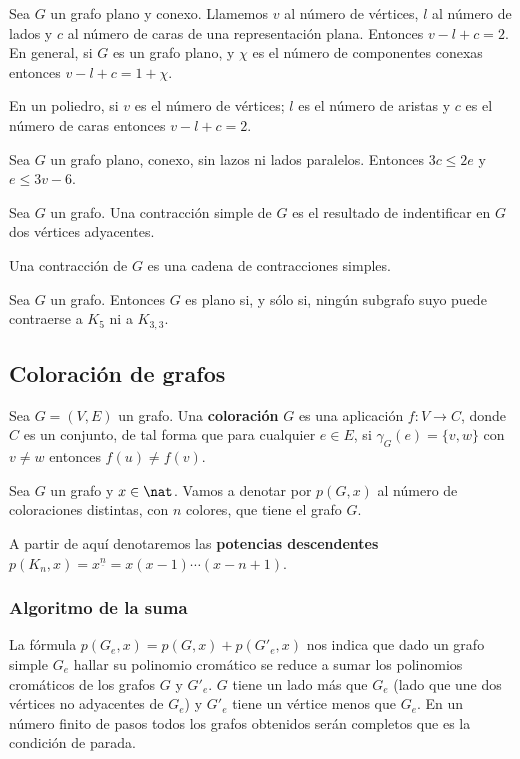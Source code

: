 \begin{nth}
    Sea $G$ un grafo plano y conexo. Llamemos $v$ al número de vértices, $l$ al número de lados y $c$ al número de caras de una representación plana. Entonces $v-l+c= 2$. En general, si $G$ es un grafo plano, y $\chi$ es el número de componentes conexas entonces $v-l+c= 1+\chi $.
\end{nth}
\begin{ncor}
    En un poliedro, si $v$ es el número de vértices; $l$ es el número de aristas y $c$ es el número de caras entonces $v-l+c= 2$.
\end{ncor}
\begin{ncor}
    Sea $G$ un grafo plano, conexo, sin lazos ni lados paralelos. Entonces $3c\leq 2e$ y $e \leq 3v-6$.
\end{ncor}
\begin{ndef}
    Sea $G$ un grafo. Una contracción simple de $G$ es el resultado de indentificar en $G$ dos vértices adyacentes.
\end{ndef}
\begin{nota}
    Una contracción de $G$ es una cadena de contracciones simples.
\end{nota}
\begin{nth}[Kuratowski]
    Sea $G$ un grafo. Entonces $G$ es plano si, y sólo si, ningún subgrafo suyo puede contraerse a $K_5$ ni a $K_{3,3}$.
\end{nth}

\subsection{Coloración de grafos}
\begin{ndef}
    Sea $G= (V, E)$ un grafo. Una \textbf{coloración} $G$ es una aplicación $f:V\to C$, donde $C$ es un conjunto, de tal forma que para cualquier $e\in E$, si $\gamma_G(e) =\{v, w\}$ con $v \neq w$ entonces $f(u)\neq f(v)$.
\end{ndef}
\begin{ndef}
    Sea $G$ un grafo y $x\in\nat$. Vamos a denotar por $p(G, x)$ al número de coloraciones distintas, con $n$ colores, que tiene el grafo $G$.
\end{ndef}
A partir de aquí denotaremos las \textbf{potencias descendentes} $p(K_n,x) = x^{\underline{n}} = x(x-1)\cdots(x-n+1)$.

\subsubsection{Algoritmo de la suma}
La fórmula $p(G_e,x)=p(G,x) + p(G'_e,x)$ nos indica que dado un grafo simple $G_e$ hallar su polinomio cromático se reduce a sumar los polinomios cromáticos de los grafos $G$ y $G'_e$. $G$ tiene un lado más que $G_e$ (lado que une dos vértices no adyacentes de $G_e$) y $G'_e$ tiene un vértice menos que $G_e$. En un número finito de pasos todos los grafos obtenidos serán completos que es la condición de parada.

